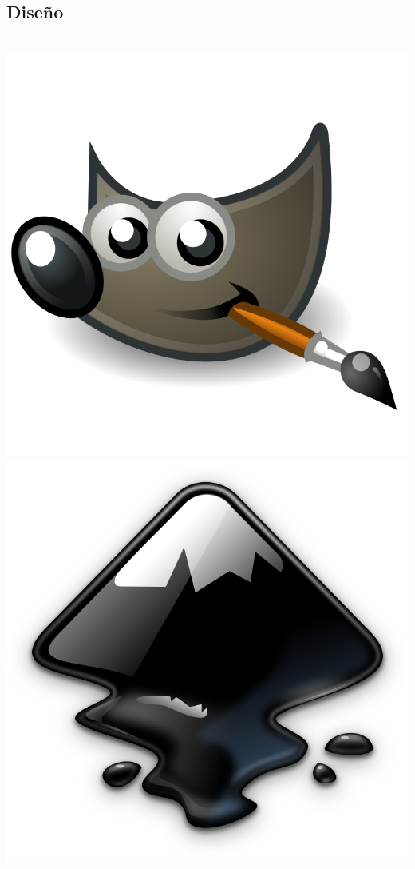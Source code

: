 \subsection{Diseño}
\begin{frame}
    \frametitle{}
    \begin{columns}
            \includegraphics[width=\textwidth]{The_GIMP.png}
            \includegraphics[width=\textwidth]{Inkscape_Logo.png}
    \end{columns}
\end{frame}

